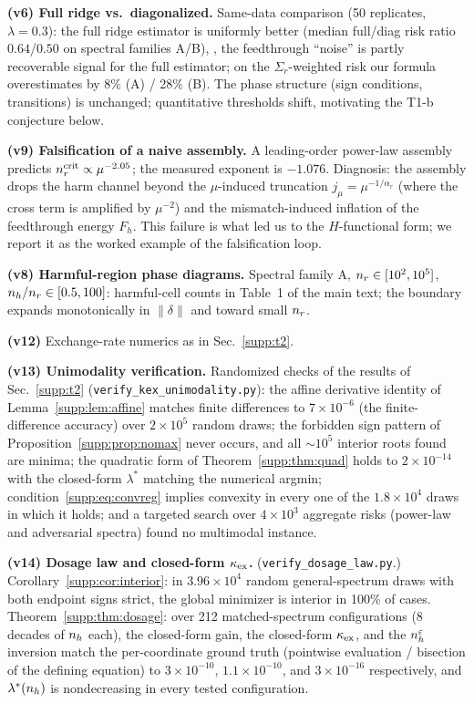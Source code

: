 \textbf{(v6) Full ridge vs.\ diagonalized.} Same-data comparison (50 replicates, $\lambda = 0.3$): the full ridge estimator is uniformly better (median full/diag risk ratio $0.64$/$0.50$ on spectral families A/B), \ie, the feedthrough ``noise'' is partly recoverable signal for the full estimator; on the $\Sigma_r$-weighted risk our formula overestimates by 8\% (A) / 28\% (B).
The phase structure (sign conditions, transitions) is unchanged; quantitative thresholds shift, motivating the T1-b conjecture below.

\textbf{(v9) Falsification of a naive assembly.} A leading-order power-law assembly predicts $n_r^{\mathrm{crit}} \propto \mu^{-2.05}$; the measured exponent is $-1.076$.
Diagnosis: the assembly drops the harm channel beyond the $\mu$-induced truncation $j_\mu = \mu^{-1/\alpha_r}$ (where the cross term is amplified by $\mu^{-2}$) and the mismatch-induced inflation of the feedthrough energy $F_h$.
This failure is what led us to the $H$-functional form; we report it as the worked example of the falsification loop.

\textbf{(v8) Harmful-region phase diagrams.} Spectral family A, $n_r \in [10^2, 10^5]$, $n_h/n_r \in [0.5, 100]$: harmful-cell counts in Table~1 of the main text; the boundary expands monotonically in $\|\delta\|$ and toward small $n_r$.

\textbf{(v12)} Exchange-rate numerics as in Sec.~\ref{supp:t2}.

\textbf{(v13) Unimodality verification.} Randomized checks of the results of Sec.~\ref{supp:t2} (\texttt{verify\_kex\_unimodality.py}): the affine derivative identity of Lemma~\ref{supp:lem:affine} matches finite differences to $7\times10^{-6}$ (the finite-difference accuracy) over $2\times10^5$ random draws; the forbidden sign pattern of Proposition~\ref{supp:prop:nomax} never occurs, and all $\sim10^5$ interior roots found are minima; the quadratic form of Theorem~\ref{supp:thm:quad} holds to $2\times10^{-14}$ with the closed-form $\lambda^*$ matching the numerical argmin; condition~\eqref{supp:eq:convreg} implies convexity in every one of the $1.8\times10^4$ draws in which it holds; and a targeted search over $4\times10^3$ aggregate risks (power-law and adversarial spectra) found no multimodal instance.

\textbf{(v14) Dosage law and closed-form $\kappa_{\mathrm{ex}}$.} (\texttt{verify\_dosage\_law.py}.) Corollary~\ref{supp:cor:interior}: in $3.96\times10^4$ random general-spectrum draws with both endpoint signs strict, the global minimizer is interior in 100\% of cases. Theorem~\ref{supp:thm:dosage}: over 212 matched-spectrum configurations (8 decades of $n_h$ each), the closed-form gain, the closed-form $\kappa_{\mathrm{ex}}$, and the $n_h^\varepsilon$ inversion match the per-coordinate ground truth (pointwise evaluation / bisection of the defining equation) to $3\times10^{-10}$, $1.1\times10^{-10}$, and $3\times10^{-16}$ respectively, and $\lambda^*(n_h)$ is nondecreasing in every tested configuration.

